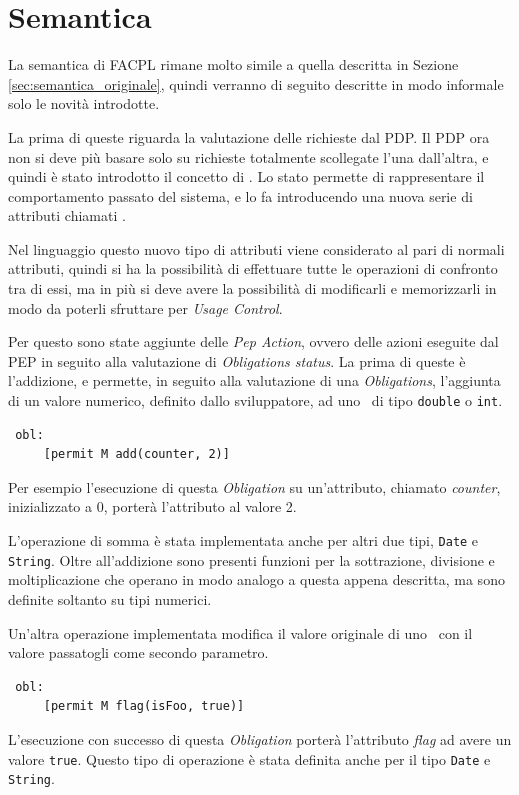 \section{Semantica} %
\label{sec:semantica}
La semantica di FACPL rimane molto simile a quella descritta in Sezione \ref{sec:semantica_originale}, quindi verranno di seguito descritte in modo informale solo le novità introdotte. \par
La prima di queste riguarda la valutazione delle richieste dal \ac{PDP}. Il \ac{PDP} ora non si deve più basare solo su richieste totalmente scollegate l'una dall'altra, e quindi è stato introdotto il concetto di \status.
Lo stato permette di rappresentare il comportamento passato del sistema, e lo fa introducendo una nuova serie di attributi chiamati \statusattribute.\par
Nel linguaggio questo nuovo tipo di attributi viene considerato al pari di normali attributi, quindi si ha la possibilità di effettuare tutte le operazioni di confronto tra di essi, ma in più si deve avere la possibilità di modificarli e memorizzarli in modo da poterli sfruttare per \textit{Usage Control}. \par

Per questo sono state aggiunte delle \textit{Pep Action}, ovvero delle azioni eseguite dal \ac{PEP} in seguito alla valutazione di \textit{Obligations status}. La prima di queste è l'addizione, 
 e permette, in seguito alla valutazione di una \textit{Obligations}, l'aggiunta di un valore numerico, definito dallo sviluppatore, ad uno \statusattribute \ di tipo \texttt{double} o \texttt{int}. 
\begin{verbatim}
 obl:
     [permit M add(counter, 2)]
\end{verbatim}
Per esempio l'esecuzione di questa \textit{Obligation} su un'attributo, chiamato \textit{counter}, inizializzato a $0$, porterà l'attributo al 
valore 2. 

L'operazione di somma è stata implementata anche per altri due tipi, \texttt{Date} e \texttt{String}.
Oltre all'addizione sono presenti funzioni per la sottrazione, divisione e moltiplicazione che operano in modo analogo a questa appena descritta, ma sono definite soltanto su tipi numerici.

Un'altra operazione implementata modifica il valore originale di uno \statusattribute \ con il valore passatogli come secondo parametro.
\begin{verbatim}
 obl:
     [permit M flag(isFoo, true)]
\end{verbatim}
L'esecuzione con successo di questa \textit{Obligation} porterà l'attributo \textit{flag} ad avere un valore \texttt{true}. Questo tipo di operazione è stata definita anche per il tipo \texttt{Date} e \texttt{String}.

